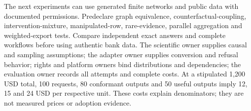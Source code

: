 The next experiments can use generated finite networks and public data with documented permissions. Predeclare graph equivalence, counterfactual-coupling, intervention-mixture, manipulated-row, rare-evidence, parallel aggregation and weighted-export tests. Compare independent exact answers and complete workflows before using authentic bank data. The scientific owner supplies causal and sampling assumptions; the adapter owner supplies conversion and refusal behavior; rights and platform owners bind distributions and dependencies; the evaluation owner records all attempts and complete costs. At a stipulated 1,200 USD total, 100 requests, 80 conformant outputs and 50 useful outputs imply 12, 15 and 24 USD per respective unit. These costs explain denominators; they are not measured prices or adoption evidence.\citep{exec24_bnlearn_contract}
